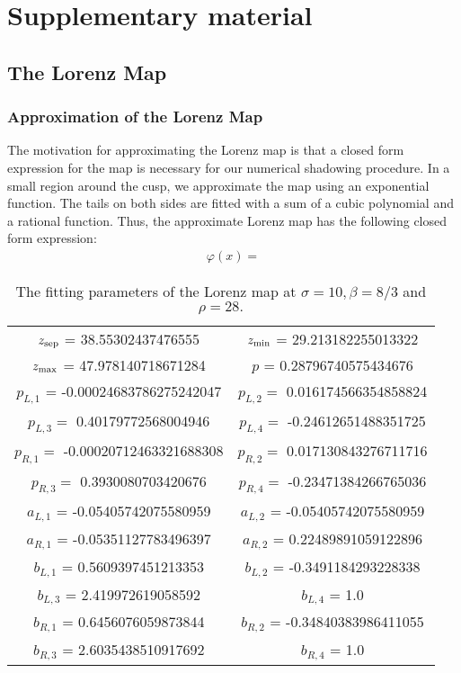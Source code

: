 \section{Supplementary material}
\subsection{The Lorenz Map}
\subsubsection{Approximation of the Lorenz Map}
The motivation for approximating the Lorenz map is that a 
closed form expression for the map is necessary for our numerical shadowing procedure. In a small region around the cusp, we approximate the map using an exponential function. The tails on both sides are fitted with a sum of a cubic polynomial and a rational function. Thus, the approximate Lorenz map has the 
following closed form expression:
\begin{align}
    \varphi(x) = 
\end{align}
\begin{table}[H]
    \centering
    \begin{tabular}{|c|c|}
    \hline 
         $z_{\rm sep}$ = 38.55302437476555 &
         $z_{\rm min}$ =  29.213182255013322 \\ 
         $z_{\rm max}$ =  47.978140718671284 & 
         $p$ = 0.28796740575434676   \\
         $p_{L,1}$ = -0.00024683786275242047 & $p_{L,2} = $ 
         0.016174566354858824 \\
         $p_{L,3} = $ 0.40179772568004946 & 
         $p_{L, 4}  = $ -0.24612651488351725 \\
         $p_{R,1} = $ -0.00020712463321688308 & 
         $p_{R,2} = $ 0.017130843276711716 \\
         $p_{R, 3} = $ 0.3930080703420676 & 
         $p_{R, 4} = $ -0.23471384266765036 \\
         $a_{L,1}$ = -0.05405742075580959 & $a_{L,2}$ = -0.05405742075580959 \\
         $a_{R,1}$ = -0.05351127783496397 & $a_{R,2}$ = 0.22489891059122896 \\
         $b_{L,1}$ = 0.5609397451213353 & $b_{L,2}$ = -0.3491184293228338 \\  $b_{L,3}$ = 2.419972619058592 & $b_{L,4}$ = 1.0 \\
         $b_{R,1}$ = 0.6456076059873844 & $b_{R,2}$ = -0.34840383986411055 \\ $b_{R,3}$ = 2.6035438510917692 &  $b_{R,4}$ = 1.0 \\
         \hline
    \end{tabular}
    \caption{The fitting parameters of the Lorenz map at $\sigma = 10, \beta = 8/3$ and $\rho = 28.$}
    \label{tab:my_label}
\end{table}


